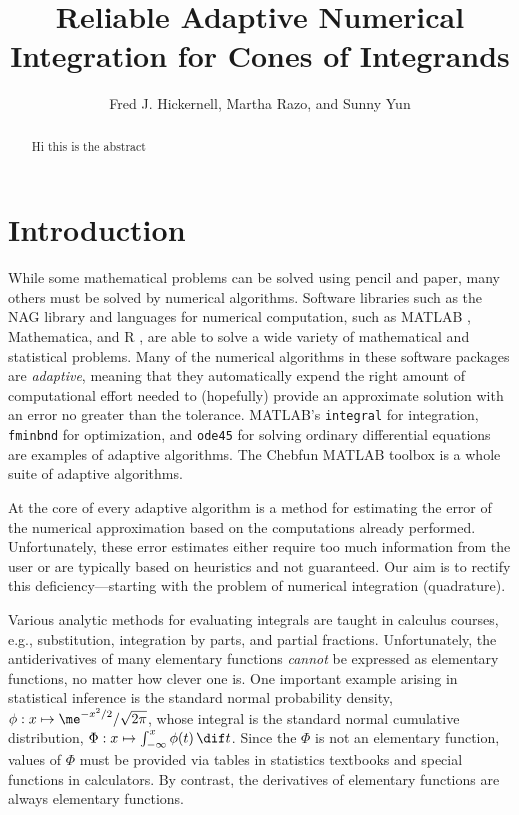 \documentclass[]{article}
\theoremstyle{definition}
\theoremstyle{remark}
\begin{document}
\title{Reliable Adaptive Numerical Integration for Cones of Integrands}
\author{Fred J. Hickernell, Martha Razo, and Sunny Yun}
\maketitle 


\begin{abstract} Hi this is the abstract
\end{abstract}

\section{Introduction} 

While some mathematical problems can be solved using pencil and paper, many others must be solved by numerical algorithms.  Software libraries such as the NAG library \cite{NAG23} and languages for numerical computation, such as MATLAB \cite{MAT8.3}, Mathematica, \cite{Mat9a} and R \cite{R3.03_2013}, are able to solve a wide variety of mathematical and statistical problems.  Many of the numerical algorithms in these software packages are \emph{adaptive}, meaning that they automatically expend the right amount of computational effort needed to (hopefully) provide an approximate solution with an error no greater than the tolerance. MATLAB's \texttt{integral} for integration, \texttt{fminbnd} for optimization, and \texttt{ode45} for solving ordinary differential equations are examples of adaptive algorithms.  The Chebfun MATLAB toolbox \cite{TrefEtal14} is a whole suite of adaptive algorithms.  

At the core of every adaptive algorithm is a method for estimating the error of the numerical approximation based on the computations already performed.  Unfortunately, these error estimates either require too much information from the user or are typically based on heuristics and not guaranteed. Our aim is to rectify this deficiency---starting with the problem of numerical integration (quadrature).

Various analytic methods for evaluating integrals are taught in calculus courses, e.g., substitution, integration by parts, and partial fractions.  Unfortunately, the antiderivatives of many elementary functions \emph{cannot} be expressed as elementary functions, no matter how clever one is.  One important example arising in statistical inference is the standard normal probability density, $\phi: x \mapsto \me^{-x^2/2}/\sqrt{2 \pi}$, whose integral is the standard normal cumulative distribution, $\Phi : x \mapsto \int_{-\infty}^x \phi(t) \, \dif t$.  Since the $\Phi$ is not an elementary function, values of $\Phi$ must be provided via tables in statistics textbooks and special functions in calculators. By contrast, the derivatives of elementary functions are always elementary functions.  
\end{document}

